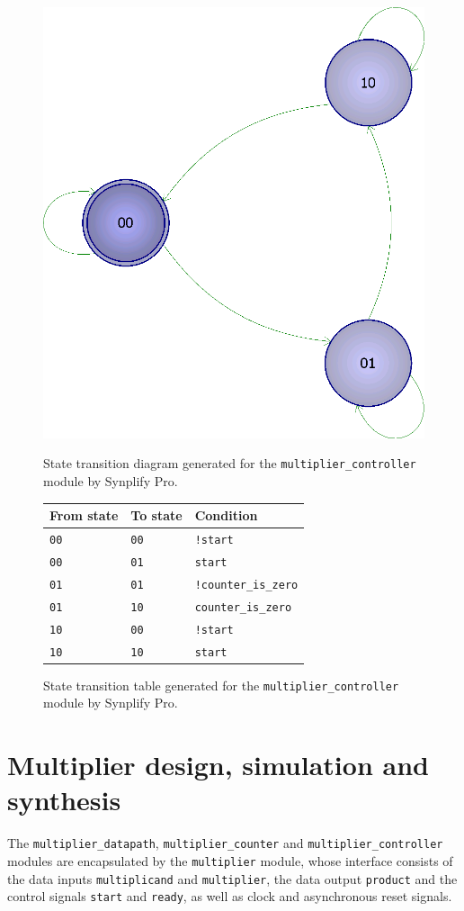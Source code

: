 \documentclass[a4paper]{article}
\begin{document}
\begin{figure}[bp]
  \centering
  \begin{minipage}{.45\textwidth}
    \centering\includegraphics[width=.4\textwidth]{assets/rtl/fsm}
    \caption{State transition diagram generated for the \texttt{multiplier\_controller} module by Synplify Pro.}
    \label{fig:fsm:diag}
  \end{minipage}
  \hfill
  \begin{minipage}{.45\textwidth}
    \centering\begin{tabular}{lll}
      \toprule
      From state & To state & Condition \\
      \midrule
      \texttt{00} & \texttt{00} & \texttt{!start} \\
      \texttt{00} & \texttt{01} & \texttt{start} \\
      \texttt{01} & \texttt{01} & \texttt{!counter\_is\_zero} \\
      \texttt{01} & \texttt{10} & \texttt{counter\_is\_zero} \\
      \texttt{10} & \texttt{00} & \texttt{!start} \\
      \texttt{10} & \texttt{10} & \texttt{start} \\
      \bottomrule
    \end{tabular}
    \caption{State transition table generated for the \texttt{multiplier\_controller} module by Synplify Pro.}
    \label{fig:fsm:tab}
  \end{minipage}
\end{figure}

\section{Multiplier design, simulation and synthesis}
\label{sec:mult}

The \texttt{multiplier\_datapath}, \texttt{multiplier\_counter} and \texttt{multiplier\_controller} modules are encapsulated by the \texttt{multiplier} module, whose interface consists of the data inputs \texttt{multiplicand} and \texttt{multiplier}, the data output \texttt{product} and the control signals \texttt{start} and \texttt{ready}, as well as clock and asynchronous reset signals.
\end{document}
